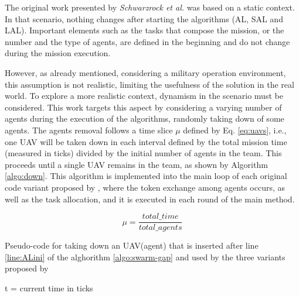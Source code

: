 
The original work presented by \textit{Schwarzrock et al.}\cite{MAS07} was based on a static context. In that scenario, nothing changes after starting the algorithms (AL, SAL and LAL). Important elements such as the tasks that compose the mission, or the number and the type of agents, are defined in the beginning and do not change during the mission execution.

However, as already mentioned, considering a military operation environment, this assumption is not realistic, limiting the usefulness of the solution in the real world. To explore a more realistic context, dynamism in the scenario must be considered. This work targets this aspect by considering a varying number of agents during the execution of the algorithms, randomly taking down of some agents. 
The agents removal follows a time slice $\mu$ defined by Eq. \ref{eq:uavs}, i.e., one UAV will be taken down in each interval defined by the total mission time (measured in ticks) divided by the initial number of agents in the team. This proceeds until a single UAV remains in the team, as shown by Algorithm \ref{algo:down}. This algorithm is implemented into the main loop of each original code variant proposed by \cite{MAS07}, where the token exchange among agents occurs, as well as the task allocation, and it is executed in each round of the main method.

\begin{equation} \label{eq:uavs}
	\mu = \frac{total\_time}{total\_agents}
\end{equation}

\begin{algorithm}[!ht]
	\caption{Pseudo-code for taking down an UAV(agent) that is inserted after line \ref{line:ALini} of the alghorithm \ref{algo:swarm-gap} and used by the three variants proposed by \cite{MAS07}}
	\label{algo:down}
	
	\SetAlgoLined
	\DontPrintSemicolon
	\SetNlSkip{0.3em}
	
	t = current time in ticks \;
	
\end{algorithm}

